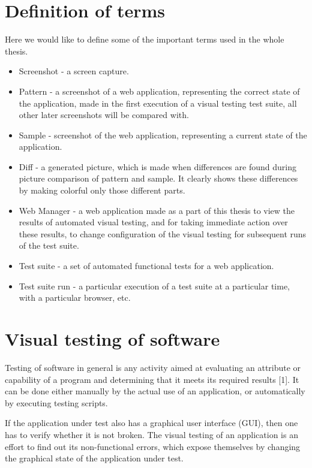\documentclass[11pt,oneside,final]{fithesis2}
\begin{document}
\chapter{Definition of terms}
Here we would like to define some of the important terms used in the whole thesis.

\begin{itemize}
 \item Screenshot - a screen capture.
 \item Pattern - a screenshot of a web application, representing the correct state of the application, made in the first execution of 
 a visual testing test suite, all other later screenshots will be compared with.
 \item Sample - screenshot of the web application, representing a current state of the application.
 \item Diff - a generated picture, which is made when differences are found during picture comparison of pattern and sample. It clearly
 shows these differences by making colorful only those different parts.
 \item Web Manager - a web application made as a part of this thesis to view the results of automated visual testing, and for taking immediate
 action over these results, to change configuration of the visual testing for subsequent runs of the test suite.
 \item Test suite - a set of automated functional tests for a web application.
 \item Test suite run - a particular execution of a test suite at a particular time, with a particular browser, etc.
\end{itemize}


\chapter{Visual testing of software}    
    Testing of software in general is any activity aimed at evaluating an attribute or capability of a program and determining that it meets its required results [1]. 
    It can be done either manually by the actual use of an application, or automatically by executing testing scripts.
    
    If the application under test also has a graphical user interface (GUI), then one has to verify whether it is not broken. 
    The visual testing of an application is an effort to find out its non-functional errors, which expose themselves by changing the graphical state of the application under test.
    
\end{document}
